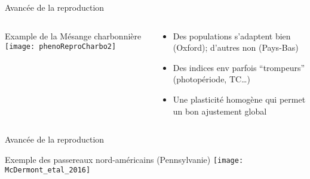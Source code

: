 \documentclass[10pt]{beamer}
\begin{document}
\begin{frame}{Avancée de la reproduction}
  \begin{columns}[c]
    \begin{column}[c]{0.6\textwidth}
      \begin{center}
        Example de la Mésange charbonnière
        \vspace{10pt}
        \texttt{[image: phenoReproCharbo2]}
      \end{center}
    \end{column}
    \begin{column}[c]{0.4\textwidth}
      \begin{itemize}
      \item Des populations s’adaptent bien (Oxford); d’autres non (Pays-Bas)
      \item Des indices env parfois ``trompeurs'' (photopériode, T\degres C…)
      \item Une plasticité homogène qui permet un bon ajustement global
      \end{itemize}
    \end{column}
  \end{columns}
  \begin{tiny}
    \cite{Charmantier2008}
  \end{tiny}
\end{frame}




\begin{frame}{Avancée de la reproduction}
  \begin{center}  
   Exemple des passereaux nord-américains (Pennsylvanie)
    \vspace{10pt}
    \texttt{[image: McDermont\_etal\_2016]}
  \end{center}
  \begin{tiny}
    \cite{McDermott2016}

  \end{tiny}
\end{frame}
\end{document}
